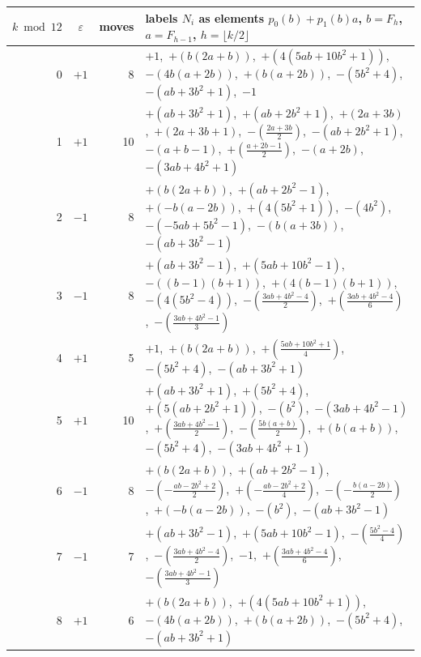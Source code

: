 {\scriptsize\begin{longtable}{@{}rcrp{}@{}}\toprule
$k \bmod 12$ & $\varepsilon$ & moves & labels $N_i$ as elements $p_0(b)+p_1(b)a$, $b=F_h$, $a=F_{h-1}$, $h=\lfloor k/2\rfloor$\\\midrule\endhead
0 & $+1$ & 8 & $+1$,\ $+(b \left(2 a + b\right))$,\ $+(4 \left(5 a b + 10 b^{2} + 1\right))$,\ $-(4 b \left(a + 2 b\right))$,\ $+(b \left(a + 2 b\right))$,\ $-(5 b^{2} + 4)$,\ $-(a b + 3 b^{2} + 1)$,\ $-1$ \\
1 & $+1$ & 10 & $+(a b + 3 b^{2} + 1)$,\ $+(a b + 2 b^{2} + 1)$,\ $+(2 a + 3 b)$,\ $+(2 a + 3 b + 1)$,\ $-(\frac{2 a + 3 b}{2})$,\ $-(a b + 2 b^{2} + 1)$,\ $-(a + b - 1)$,\ $+(\frac{a + 2 b - 1}{2})$,\ $-(a + 2 b)$,\ $-(3 a b + 4 b^{2} + 1)$ \\
2 & $-1$ & 8 & $+(b \left(2 a + b\right))$,\ $+(a b + 2 b^{2} - 1)$,\ $+(- b \left(a - 2 b\right))$,\ $+(4 \left(5 b^{2} + 1\right))$,\ $-(4 b^{2})$,\ $-(- 5 a b + 5 b^{2} - 1)$,\ $-(b \left(a + 3 b\right))$,\ $-(a b + 3 b^{2} - 1)$ \\
3 & $-1$ & 8 & $+(a b + 3 b^{2} - 1)$,\ $+(5 a b + 10 b^{2} - 1)$,\ $-(\left(b - 1\right) \left(b + 1\right))$,\ $+(4 \left(b - 1\right) \left(b + 1\right))$,\ $-(4 \left(5 b^{2} - 4\right))$,\ $-(\frac{3 a b + 4 b^{2} - 4}{2})$,\ $+(\frac{3 a b + 4 b^{2} - 4}{6})$,\ $-(\frac{3 a b + 4 b^{2} - 1}{3})$ \\
4 & $+1$ & 5 & $+1$,\ $+(b \left(2 a + b\right))$,\ $+(\frac{5 a b + 10 b^{2} + 1}{4})$,\ $-(5 b^{2} + 4)$,\ $-(a b + 3 b^{2} + 1)$ \\
5 & $+1$ & 10 & $+(a b + 3 b^{2} + 1)$,\ $+(5 b^{2} + 4)$,\ $+(5 \left(a b + 2 b^{2} + 1\right))$,\ $-(b^{2})$,\ $-(3 a b + 4 b^{2} - 1)$,\ $+(\frac{3 a b + 4 b^{2} - 1}{2})$,\ $-(\frac{5 b \left(a + b\right)}{2})$,\ $+(b \left(a + b\right))$,\ $-(5 b^{2} + 4)$,\ $-(3 a b + 4 b^{2} + 1)$ \\
6 & $-1$ & 8 & $+(b \left(2 a + b\right))$,\ $+(a b + 2 b^{2} - 1)$,\ $-(- \frac{a b - 2 b^{2} + 2}{2})$,\ $+(- \frac{a b - 2 b^{2} + 2}{4})$,\ $-(- \frac{b \left(a - 2 b\right)}{2})$,\ $+(- b \left(a - 2 b\right))$,\ $-(b^{2})$,\ $-(a b + 3 b^{2} - 1)$ \\
7 & $-1$ & 7 & $+(a b + 3 b^{2} - 1)$,\ $+(5 a b + 10 b^{2} - 1)$,\ $-(\frac{5 b^{2} - 4}{4})$,\ $-(\frac{3 a b + 4 b^{2} - 4}{2})$,\ $-1$,\ $+(\frac{3 a b + 4 b^{2} - 4}{6})$,\ $-(\frac{3 a b + 4 b^{2} - 1}{3})$ \\
8 & $+1$ & 6 & $+(b \left(2 a + b\right))$,\ $+(4 \left(5 a b + 10 b^{2} + 1\right))$,\ $-(4 b \left(a + 2 b\right))$,\ $+(b \left(a + 2 b\right))$,\ $-(5 b^{2} + 4)$,\ $-(a b + 3 b^{2} + 1)$ \\

\end{longtable}}
